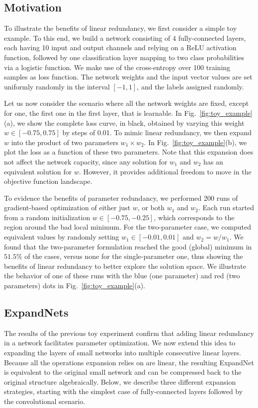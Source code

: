 \documentclass[10pt,twocolumn,letterpaper]{article}
\begin{document}
\subsection{Motivation}
To illustrate the benefits of linear redundancy, we first consider a simple toy example. To this end, we build a network consisting of 4 fully-connected layers, each having 10 input and output channels and relying on a ReLU activation function, followed by one classification layer mapping to two class probabilities via a logistic function. We make use of the cross-entropy over 100 training samples as loss function. The network weights and the input vector values are set uniformly randomly in the interval $[-1,1]$, and the labels assigned randomly. 

Let us now consider the scenario where all the network weights are fixed, except for one, the first one in the first layer, that is learnable. In Fig.~\ref{fig:toy_example}(a), we show the complete loss curve, in black, obtained by varying this weight $w \in [-0.75, 0.75]$ by steps of 0.01. To mimic linear redundancy, we then expand $w$ into the product of two parameters $w_{1} \times w_{2}$. In Fig.~\ref{fig:toy_example}(b), we plot the loss as a function of these two parameters. Note that this expansion does not affect the network capacity, since any solution for $w_1$ and $w_2$ has an equivalent solution for $w$. However, it provides additional freedom to move in the objective function landscape.

To evidence the benefits of parameter redundancy, we performed 200 runs of gradient-based optimization of either just $w$, or both $w_1$ and $w_2$. Each run started from a random initialization $w\in[-0.75, -0.25]$, which corresponds to the region around the bad local minimum. For the two-parameter case, we computed equivalent values by randomly setting $w_1\in[-0.01, 0.01]$ and $w_2=w/w_1$. We found that
the two-parameter formulation reached the good (global) minimum in  $51.5\%$ of the cases, versus none for the single-parameter one, thus showing the benefits of linear redundancy to better explore the solution space. We illustrate the behavior of one of these runs with the blue (one parameter) and red (two parameters) dots in Fig.~\ref{fig:toy_example}(a). 

\subsection{ExpandNets}

The results of the previous toy experiment confirm that adding linear redundancy in a network facilitates parameter optimization. We now extend this idea to expanding the layers of small networks into multiple consecutive linear layers. Because all the operations expansion relies on are linear, the resulting ExpandNet is equivalent to the original small network and can be compressed back to the original structure algebraically. Below, we describe three different expansion strategies, starting with the simplest case of fully-connected layers followed by the convolutional scenario.
\end{document}
